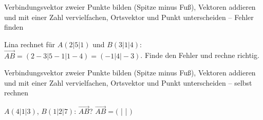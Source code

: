 \begin{aufgabe}{Verbindungsvektor zweier Punkte bilden (Spitze minus Fuß), Vektoren addieren und mit einer Zahl vervielfachen, Ortsvektor und Punkt unterscheiden – Fehler finden}
\begin{teile}
\teil Lina rechnet für $A(2 | 5 | 1)$ und $B(3 | 1 | 4)$: $\overrightarrow{AB} = (2-3 | 5-1 | 1-4) = (-1 | 4 | -3)$. Finde den Fehler und rechne richtig.
\end{teile}
\end{aufgabe}

\begin{aufgabe}{Verbindungsvektor zweier Punkte bilden (Spitze minus Fuß), Vektoren addieren und mit einer Zahl vervielfachen, Ortsvektor und Punkt unterscheiden – selbst rechnen}
\begin{teile}
\teil $A(4 | 1 | 3)$, $B(1 | 2 | 7)$: $\overrightarrow{AB}$? $\overrightarrow{AB} = ($ \leerfeld | \leerfeld | \leerfeld $)$
\end{teile}
\end{aufgabe}
